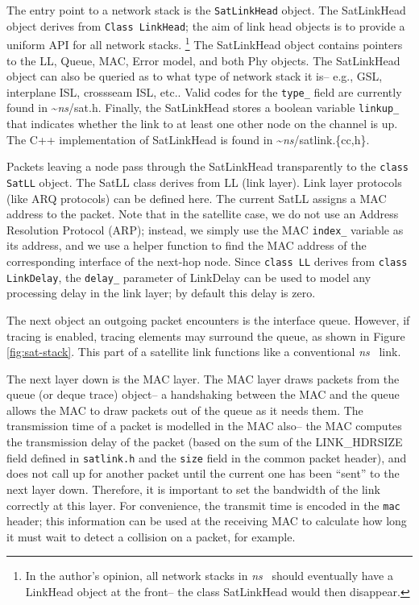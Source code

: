 The entry point to a network stack is the {\tt SatLinkHead} object.  The
SatLinkHead object derives from {\tt Class LinkHead}; the aim of link
head objects is to provide a uniform API for all network stacks.
\footnote{In the author's opinion, all network stacks in \emph{ns}~ should 
eventually have a LinkHead object at the front-- the class SatLinkHead 
would then disappear.}  The SatLinkHead object contains pointers to
the LL, Queue, MAC, Error model, and both Phy objects.  The SatLinkHead
object can also be queried as to what type of network stack it is-- e.g.,
GSL, interplane ISL, crossseam ISL, etc..  Valid codes for the {\tt type\_} 
field are currently found in \textasciitilde\emph{ns}/{sat.h}.  Finally, the SatLinkHead
stores a boolean variable {\tt linkup\_} that indicates whether
the link to at least one other node on the channel is up.  The C++
implementation of SatLinkHead is found in \textasciitilde\emph{ns}/{satlink.\{cc,h\}}.

Packets leaving a node pass through the SatLinkHead transparently to the 
{\tt class SatLL} object.  The SatLL class derives from LL (link layer).
Link layer protocols (like ARQ protocols) can be defined here.  The current
SatLL assigns a MAC address to the packet.  Note that in the satellite case,
we do not use an Address Resolution Protocol (ARP); instead, we simply use
the MAC {\tt index\_} variable as its address, and we use a helper function
to find the MAC address of the corresponding interface of the next-hop node.  
Since {\tt class LL} derives from {\tt class LinkDelay}, the {\tt delay\_}
parameter of LinkDelay can be used to model any processing delay in the
link layer; by default this delay is zero.

The next object an outgoing packet encounters is the interface queue.  
However, if tracing is enabled, tracing elements may surround the
queue, as shown in Figure \ref{fig:sat-stack}.  This part of a satellite
link functions like a conventional \emph{ns}~ link.

The next layer down is the MAC layer.  The MAC layer draws packets from
the queue (or deque trace) object-- a handshaking between the MAC and the 
queue allows the MAC to draw packets out of the queue as it needs them.  The
transmission time of a packet is modelled in the MAC also-- the MAC computes
the transmission delay of the packet (based on the sum of the 
LINK\_HDRSIZE field defined in {\tt satlink.h} and the {\tt size} field 
in the common packet header), and does not call up for another packet until
the current one has been ``sent'' to the next layer down.  Therefore, it
is important to set the bandwidth of the link correctly at this layer.
For convenience, the transmit time is encoded in the {\tt mac} header; this
information can be used at the receiving MAC to calculate how long it must
wait to detect a collision on a packet, for example.

